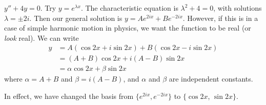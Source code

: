 \documentclass[a4paper]{article}
\begin{document}
\begin{eg}
  $y'' + 4y = 0$. Try $y = e^{\lambda x}$. The characteristic equation is $\lambda^2 + 4 = 0$, with solutions $\lambda = \pm 2i$. Then our general solution is $y = Ae^{2ix} + Be^{-2ix}$. However, if this is in a case of simple harmonic motion in physics, we want the function to be real (or \emph{look} real). We can write
  \begin{align*}
    y &= A(\cos 2x + i\sin 2x) + B(\cos 2x - i\sin 2x)\\
    &= (A + B)\cos 2x + i(A - B)\sin 2x\\
    &= \alpha\cos 2x + \beta\sin 2x
  \end{align*}
  where $\alpha = A + B$ and $\beta = i(A - B)$, and $\alpha$ and $\beta$ are independent constants.

  In effect, we have changed the basis from $\{e^{2ix}, e^{-2ix}\}$ to $\{\cos 2x$, $\sin 2x\}$.
\end{eg}
\end{document}
